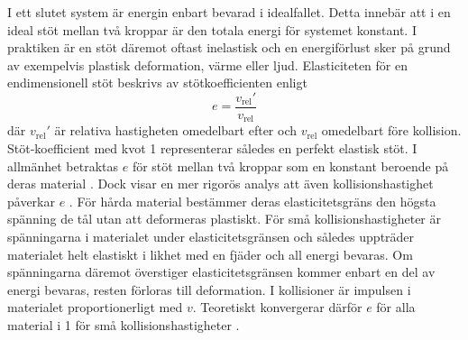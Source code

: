 I ett slutet system är energin enbart bevarad i idealfallet. Detta innebär att i en ideal stöt mellan två kroppar är den totala energi för systemet konstant. I praktiken är en stöt däremot oftast inelastisk och en energiförlust sker på grund av exempelvis plastisk deformation, värme eller ljud. Elasticiteten för en endimensionell stöt beskrivs av stötkoefficienten enligt 
\begin{equation} \label{ekv:e}
     e = \frac{v_{\text{rel}}'}{v_{\text{rel}}}
 \end{equation}
där $v_{\text{rel}}'$ är relativa hastigheten omedelbart efter och $v_{\text{rel}}$ omedelbart före kollision. Stöt-koefficient med kvot 1 representerar således en perfekt elastisk stöt. I allmänhet betraktas $e$ för stöt mellan två kroppar som en konstant beroende på deras material \cite{Meriam_Kraige_Bolton_2020}. Dock visar en mer rigorös analys att även kollisionshastighet påverkar $e$ \cite{stöte}. För hårda material bestämmer deras elasticitetsgräns den högsta spänning de tål utan att deformeras plastiskt. För små kollisionshastigheter är spänningarna i materialet under elasticitetsgränsen och således uppträder materialet helt elastiskt i likhet med en fjäder och all energi bevaras. Om spänningarna däremot överstiger elasticitetsgränsen kommer enbart en del av energi bevaras, resten förloras till deformation. I kollisioner är impulsen i materialet proportionerligt med $v$. Teoretiskt konvergerar därför $e$ för alla material i 1 för små kollisionshastigheter \cite{Meriam_Kraige_Bolton_2020}. 





